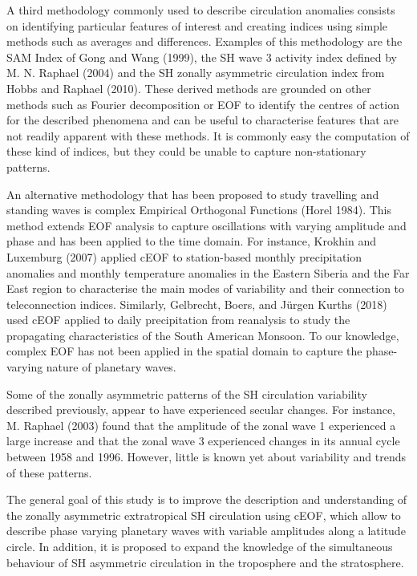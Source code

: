 \documentclass[smallextended]{svjour3}       %
\begin{document}
A third methodology commonly used to describe circulation anomalies consists on identifying particular features of interest and creating indices using simple methods such as averages and differences.
Examples of this methodology are the SAM Index of Gong and Wang (1999), the SH wave 3 activity index defined by M. N. Raphael (2004) and the SH zonally asymmetric circulation index from Hobbs and Raphael (2010).
These derived methods are grounded on other methods such as Fourier decomposition or EOF to identify the centres of action for the described phenomena and can be useful to characterise features that are not readily apparent with these methods.
It is commonly easy the computation of these kind of indices, but they could be unable to capture non-stationary patterns.

An alternative methodology that has been proposed to study travelling and standing waves is complex Empirical Orthogonal Functions (Horel 1984).
This method extends EOF analysis to capture oscillations with varying amplitude and phase and has been applied to the time domain.
For instance, Krokhin and Luxemburg (2007) applied cEOF to station-based monthly precipitation anomalies and monthly temperature anomalies in the Eastern Siberia and the Far East region to characterise the main modes of variability and their connection to teleconnection indices.
Similarly, Gelbrecht, Boers, and Jürgen Kurths (2018) used cEOF applied to daily precipitation from reanalysis to study the propagating characteristics of the South American Monsoon.
To our knowledge, complex EOF has not been applied in the spatial domain to capture the phase-varying nature of planetary waves.

Some of the zonally asymmetric patterns of the SH circulation variability described previously, appear to have experienced secular changes.
For instance, M. Raphael (2003) found that the amplitude of the zonal wave 1 experienced a large increase and that the zonal wave 3 experienced changes in its annual cycle between 1958 and 1996.
However, little is known yet about variability and trends of these patterns.

The general goal of this study is to improve the description and understanding of the zonally asymmetric extratropical SH circulation using cEOF, which allow to describe phase varying planetary waves with variable amplitudes along a latitude circle.
In addition, it is proposed to expand the knowledge of the simultaneous behaviour of SH asymmetric circulation in the troposphere and the stratosphere.
\end{document}

